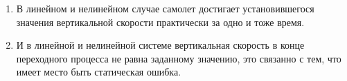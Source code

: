 \begin{enumerate}
    \item В линейном и нелинейном случае самолет достигает установившегося значения вертикальной скорости практически за одно и тоже время. 
    \item И в линейной и нелинейной системе вертикальная скорость в конце переходного процесса не равна заданному значению, это связанно с тем, что имеет место быть статическая ошибка. 
\end{enumerate}